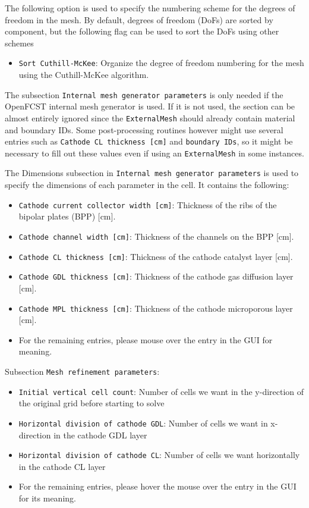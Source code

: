 The following option is used to specify the numbering scheme for the degrees of freedom in the mesh. By default, degrees of freedom (DoFs) are sorted by component, but the following flag can be used to sort the DoFs using other schemes
\begin{itemize}
 \item \texttt{Sort Cuthill-McKee}: Organize the degree of freedom numbering for the mesh using the Cuthill-McKee algorithm.
\end{itemize}

The subsection \texttt{Internal mesh generator parameters} is only needed if the OpenFCST internal mesh generator is used. If it is not used, the section can be almost entirely ignored since the \texttt{ExternalMesh} should already contain material and boundary IDs. Some post-processing routines however might use several entries such as \texttt{Cathode CL thickness [cm]} and \texttt{boundary IDs}, so it might be necessary to fill out these values even if using an \texttt{ExternalMesh} in some instances.

The Dimensions subsection in \texttt{Internal mesh generator parameters} is used to specify the dimensions of each parameter in the cell. It contains the following:
\begin{itemize}
  \item \texttt{Cathode current collector width [cm]}: Thickness of the ribs of the bipolar plates (BPP) [cm].
  \item \texttt{Cathode channel width [cm]}: Thickness of the channels on the BPP [cm].
  \item \texttt{Cathode CL thickness [cm]}: Thickness of the cathode catalyst layer [cm].
  \item \texttt{Cathode GDL thickness [cm]}: Thickness of the cathode gas diffusion layer [cm].
  \item \texttt{Cathode MPL thickness [cm]}: Thickness of the cathode microporous layer [cm].
  \item For the remaining entries, please mouse over the entry in the GUI for meaning.
\end{itemize}

Subsection \texttt{Mesh refinement parameters}:
\begin{itemize}
  \item \texttt{Initial vertical cell count}: Number of cells we want in the y-direction of the original grid before starting to solve
  \item \texttt{Horizontal division of cathode GDL}: Number of cells we want in x-direction in the cathode GDL layer
  \item \texttt{Horizontal division of cathode CL}: Number of cells we want horizontally in the cathode CL layer
  \item For the remaining entries, please hover the mouse over the entry in the GUI for its meaning.
\end{itemize}

